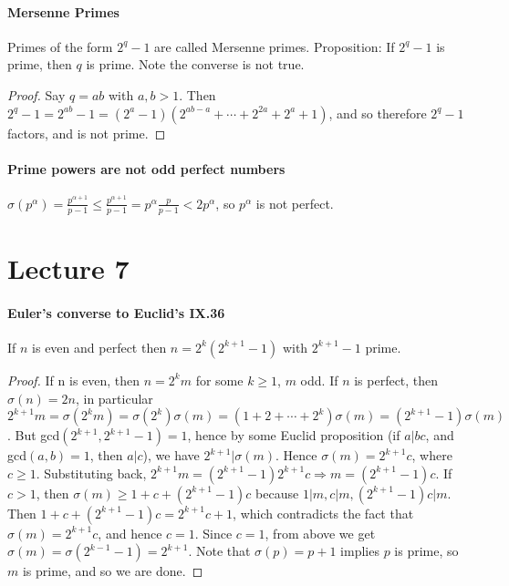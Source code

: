\documentclass[10pt,letter]{article}
\theoremstyle{plain}
\theoremstyle{definition}
\begin{document}
\paragraph{Mersenne Primes}
Primes of the form $2^q-1$ are called Mersenne primes. Proposition: If $2^q-1$ is prime, then $q$ is prime. Note the converse is not true. 
\begin{proof}
     Say $q=ab$ with $a,b>1$. Then $2^q-1=2^{ab}-1=(2^a-1)(2^{ab-a}+\cdots+2^{2a}+2^a+1)$, and so therefore $2^q-1$ factors, and is not prime. 
\end{proof}


\paragraph{Prime powers are not odd perfect numbers}
$\sigma(p^\alpha)=\frac{p^{\alpha+1}}{p-1}\leq\frac{p^{\alpha+1}}{p-1}=p^\alpha\frac{p}{p-1}<2p^\alpha$, so $p^\alpha$ is not perfect. 




\section*{Lecture 7}
\paragraph{Euler's converse to Euclid's IX.36}
If $n$ is even and perfect then $n=2^k(2^{k+1}-1)$ with $2^{k+1}-1$ prime. 
\begin{proof}
     If n is even, then $n=2^km$ for some $k\geq1$, $m$ odd. If $n$ is perfect, then $\sigma(n)=2n$, in particular $2^{k+1}m=\sigma(2^km)=\sigma(2^k)\sigma(m)=(1+2+\cdots+2^k)\sigma(m)=(2^{k+1}-1)\sigma(m)$. But gcd$(2^{k+1},2^{k+1}-1)=1$, hence by some Euclid proposition (if $a|bc$, and gcd$(a,b)=1$, then $a|c$), we have $2^{k+1}|\sigma(m)$. Hence $\sigma(m)=2^{k+1}c$, where $c\geq1$. Substituting back, $2^{k+1}m=(2^{k+1}-1)2^{k+1}c\Rightarrow m =(2^{k+1}-1)c$. If $c>1$, then $\sigma(m)\geq1+c+(2^{k+1}-1)c$ because $1|m,c|m,(2^{k+1}-1)c|m$. Then $1+c+(2^{k+1}-1)c=2^{k+1}c+1$, which contradicts the fact that $\sigma(m)=2^{k+1}c$, and hence $c=1$. Since $c=1$, from above we get $\sigma(m)=\sigma(2^{k-1}-1)=2^{k+1}$. Note that $\sigma(p)=p+1$ implies $p$ is prime, so $m$ is prime, and so we are done. 
\end{proof}
\end{document}
